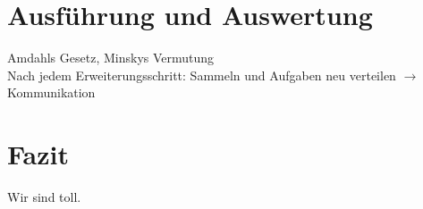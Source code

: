 \documentclass[a4paper]{scrartcl}
\begin{document}
\section{Ausführung und Auswertung}
Amdahls Gesetz, Minskys Vermutung\\
Nach jedem Erweiterungsschritt: Sammeln und Aufgaben neu verteilen $\rightarrow$ Kommunikation

\section{Fazit}
Wir sind toll.

\newpage
\printbibliography[heading=bibintoc]
\end{document}
